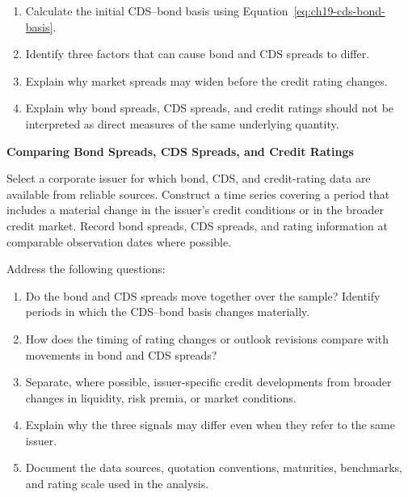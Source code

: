 \begin{enumerate}
\begin{enumerate}

\item Calculate the initial CDS--bond basis using Equation~\eqref{eq:ch19-cds-bond-basis}.

\item Identify three factors that can cause bond and CDS spreads to differ.

\item Explain why market spreads may widen before the credit rating changes.

\item Explain why bond spreads, CDS spreads, and credit ratings should not be interpreted as direct measures of the same underlying quantity.

\end{enumerate}

\end{enumerate}





\textbf{Comparing Bond Spreads, CDS Spreads, and Credit Ratings}

Select a corporate issuer for which bond, CDS, and credit-rating data are available from reliable sources. Construct a time series covering a period that includes a material change in the issuer's credit conditions or in the broader credit market. Record bond spreads, CDS spreads, and rating information at comparable observation dates where possible.

Address the following questions:

\begin{enumerate}

\item Do the bond and CDS spreads move together over the sample? Identify periods in which the CDS--bond basis changes materially.

\item How does the timing of rating changes or outlook revisions compare with movements in bond and CDS spreads?

\item Separate, where possible, issuer-specific credit developments from broader changes in liquidity, risk premia, or market conditions.

\item Explain why the three signals may differ even when they refer to the same issuer.

\item Document the data sources, quotation conventions, maturities, benchmarks, and rating scale used in the analysis.

\end{enumerate}


